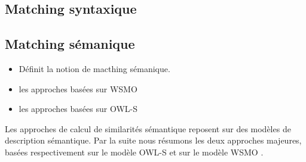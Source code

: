   \subsection{Matching syntaxique}
  \label{sec:matching-syntactique}

  \subsection{Matching sémanique}
  \label{sec:matching-semanique}

  {\color{red}
    \begin{itemize}
    \item Définit la notion de macthing sémanique.
    \item les approches basées sur \textsc{WSMO}
      \cite{paolucci2002semantic, keller2004wsmo}
    \item les approches basées sur \textsc{OWL-S}
      \cite{paolucci2002semantic,benatallah2003request,
        benatallah2005automating, martin2004owl}
    \end{itemize}
  }

  Les approches de calcul de similarités sémantique reposent sur des
  modèles de description sémantique. Par la suite nous résumons
  les deux approches majeures, basées respectivement sur le modèle
  \textsc{OWL-S} et sur le modèle \textsc{WSMO} \cite{elie2010}.






